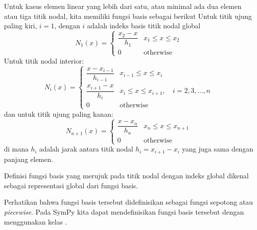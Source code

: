 Untuk kasus elemen linear yang lebih dari satu, atau minimal ada dua elemen
atau tiga titik nodal, kita memiliki fungsi basis sebagai berikut
Untuk titik ujung paling kiri, $i=1$, dengan $i$ adalah indeks basis titik nodal global
\begin{equation}
N_{1}(x) = \begin{cases}
\dfrac{x_{2} - x}{h_1} & x_{1} \leq x \leq x_{2} \\[10pt]
0 & \text{otherwise}
\end{cases}
\end{equation}
%
Untuk titik nodal interior:
\begin{equation}
N_{i}(x) = \begin{cases}
\dfrac{x - x_{i-1}}{h_{i-1}} & x_{i-1} \leq x \leq x_{i} \\[10pt]
\dfrac{x_{i+1} - x}{h_{i}} & x_{i} \leq x \leq x_{i+1},\quad i=2,3,\ldots,n \\[10pt]
0 & \text{otherwise}
\end{cases}
\end{equation}
%
dan untuk titik ujung paling kanan:
\begin{equation}
N_{n+1}(x) = \begin{cases} \dfrac{x - x_{n}}{h_{n}} & x_{n} \leq x \leq x_{n+1} \\[10pt]
0 & \text{otherwise}
\end{cases}
\end{equation}
di mana $h_{i}$ adalah jarak antara titik nodal
$h_{i} = x_{i+1} - x_{i}$ yang juga sama dengan panjang elemen.

Definisi fungsi basis yang merujuk pada titik nodal dengan indeks global
dikenal sebagai representasi global dari fungsi basis. 

Perhatikan bahwa fungsi basis tersebut didefinisikan sebagai fungsi sepotong
atau \textit{piecewise}.
Pada SymPy kita dapat mendefinisikan fungsi basis tersebut dengan menggunakan kelas
.

